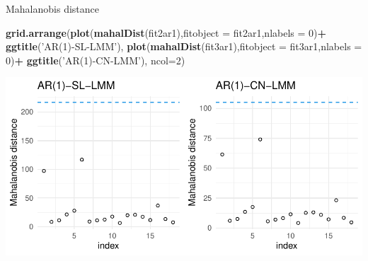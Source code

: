 \documentclass[
  ignorenonframetext,
]{beamer}
\newenvironment{Shaded}{\begin{snugshade}}{\end{snugshade}}
\newcommand{\DataTypeTok}[1]{\textcolor[rgb]{0.13,0.29,0.53}{#1}}
\newcommand{\DecValTok}[1]{\textcolor[rgb]{0.00,0.00,0.81}{#1}}
\newcommand{\KeywordTok}[1]{\textcolor[rgb]{0.13,0.29,0.53}{\textbf{#1}}}
\newcommand{\NormalTok}[1]{#1}
\newcommand{\OperatorTok}[1]{\textcolor[rgb]{0.81,0.36,0.00}{\textbf{#1}}}
\newcommand{\StringTok}[1]{\textcolor[rgb]{0.31,0.60,0.02}{#1}}
\begin{document}
\begin{frame}[fragile]{Mahalanobis distance}
\protect\hypertarget{mahalanobis-distance}{}

\scriptsize

\begin{Shaded}
\begin{Highlighting}[]
\KeywordTok{grid.arrange}\NormalTok{(}\KeywordTok{plot}\NormalTok{(}\KeywordTok{mahalDist}\NormalTok{(fit2ar1),}\DataTypeTok{fitobject =}\NormalTok{ fit2ar1,}\DataTypeTok{nlabels =} \DecValTok{0}\NormalTok{)}\OperatorTok{+}
\StringTok{               }\KeywordTok{ggtitle}\NormalTok{(}\StringTok{'AR(1)-SL-LMM'}\NormalTok{),}
             \KeywordTok{plot}\NormalTok{(}\KeywordTok{mahalDist}\NormalTok{(fit3ar1),}\DataTypeTok{fitobject =}\NormalTok{ fit3ar1,}\DataTypeTok{nlabels =} \DecValTok{0}\NormalTok{)}\OperatorTok{+}
\StringTok{               }\KeywordTok{ggtitle}\NormalTok{(}\StringTok{'AR(1)-CN-LMM'}\NormalTok{),}
             \DataTypeTok{ncol=}\DecValTok{2}\NormalTok{)}
\end{Highlighting}
\end{Shaded}

\begin{center}\includegraphics[width=0.8\linewidth]{codes_files/figure-beamer/mahal1-1} \end{center}

\end{frame}
\end{document}
